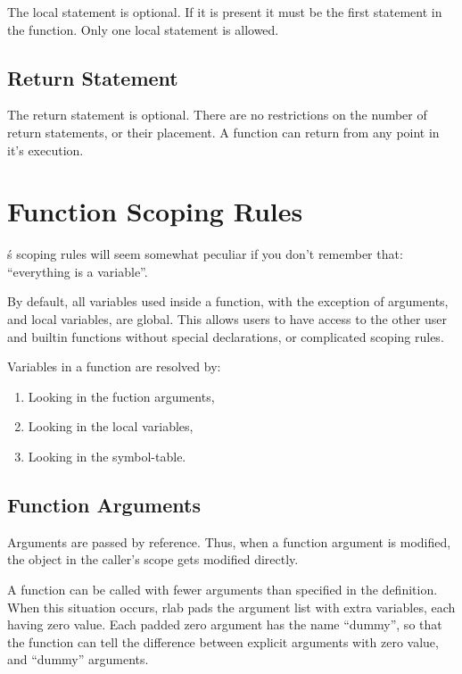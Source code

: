    The local statement is optional. If it is present it must be the
   first statement in the function. Only one local statement is
   allowed.

\subsection{Return Statement}

   The return statement is optional. There are no restrictions on the
   number of return statements, or their placement. A function can
   return from any point in it's execution.

\section{Function Scoping Rules}

   \RLaB\'s scoping rules will seem somewhat peculiar if you don't
   remember that: ``everything is a variable''. 

   By default, all variables used inside a function, with the
   exception of arguments, and local variables, are global. This
   allows users to have access to the other user and builtin functions
   without special declarations, or complicated scoping rules.

   Variables in a function are resolved by:

   \begin{enumerate}
      \item Looking in the fuction arguments,
      \item Looking in the local variables,
      \item Looking in the symbol-table.
   \end{enumerate}

\subsection{Function Arguments}

   Arguments are passed by reference. Thus, when a function argument
   is modified, the object in the caller's scope gets modified
   directly.

   A function can be called with fewer arguments than specified in the
   definition. When this situation occurs, rlab pads the argument list
   with extra variables, each having zero value. Each padded zero
   argument has the name ``dummy'', so that the function can tell the
   difference between explicit arguments with zero value, and
   ``dummy'' arguments.


